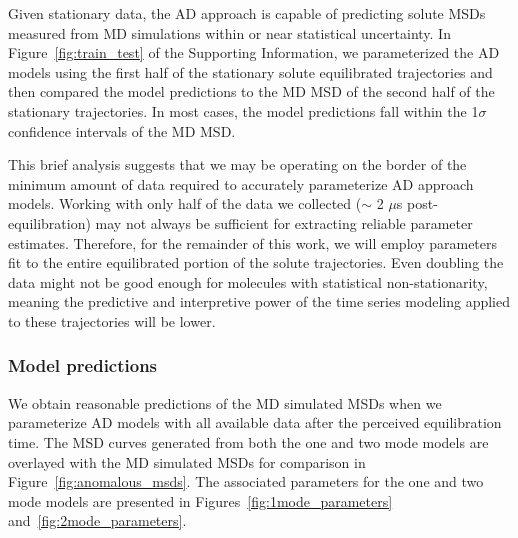 \documentclass[journal=ancac3,manuscript=article,layout=twocolumn]{achemso}
\begin{document}
  Given stationary data, the AD approach is capable of predicting solute MSDs
  measured from MD simulations within or near statistical uncertainty. In
  Figure~\ref{fig:train_test} of the Supporting Information, we parameterized
  the AD models using the first half of the stationary solute equilibrated
  trajectories and then compared the model predictions to the MD MSD of the
  second half of the stationary trajectories. In most cases, the model
  predictions fall within the 1$\sigma$ confidence intervals of the MD MSD.
  
  This brief analysis suggests that we may be operating on the border of the
  minimum amount of data required to accurately parameterize AD approach
  models. Working with only half of the data we collected ($\sim$ 2 $\mu$s
  post-equilibration) may not always be sufficient for extracting reliable
  parameter estimates. Therefore, for the remainder of this work, we will
  employ parameters fit to the entire equilibrated portion of the solute
  trajectories. Even doubling the data might not be good enough for molecules
  with statistical non-stationarity, meaning the predictive and interpretive
  power of the time series modeling applied to these trajectories will be
  lower.

  \subsubsection{Model predictions}\label{section:AD_all_data}
 
  We obtain reasonable predictions of the MD simulated MSDs when we
  parameterize AD models with all available data after the perceived
  equilibration time. The MSD curves generated from both the one and 
  two mode models are overlayed with the MD simulated MSDs for comparison in
  Figure~\ref{fig:anomalous_msds}. The associated parameters for the one and two
  mode models are presented in Figures~\ref{fig:1mode_parameters}
  and~\ref{fig:2mode_parameters}.
  
\end{document}
